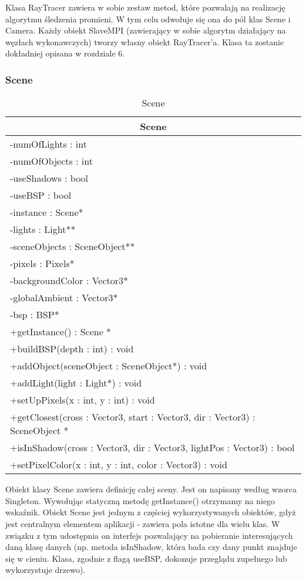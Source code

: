 Klasa RayTracer zawiera w sobie zestaw metod, które pozwalają na realizację algorytmu śledzenia promieni. W tym celu odwołuje się ona do pól klas Scene i Camera. Każdy obiekt SlaveMPI (zawierający w sobie algorytm działający na węzłach wykonawczych) tworzy własny obiekt RayTracer'a. Klasa ta zostanie dokładniej opisana w rozdziale 6.

\subsubsection{Scene}

\footnotesize
\begin{longtable}{|p{14cm}|}
    \caption{Scene} \label{tab:Scene} \\ \hline
    \multicolumn{1}{|c|}{Scene} \\ \hline
    -numOfLights : int \\
    -numOfObjects : int \\
    -useShadows : bool \\
    -useBSP : bool \\
    -instance : Scene* \\
    -lights : Light** \\
    -sceneObjects : SceneObject** \\
    -pixels : Pixels* \\
    -backgroundColor : Vector3* \\
    -globalAmbient : Vector3* \\
    -bsp : BSP* \\
    \hline
	+getInstance() : Scene * \\
	+buildBSP(depth : int) : void \\
	+addObject(sceneObject : SceneObject*) : void \\
	+addLight(light : Light*) : void \\
	+setUpPixels(x : int, y : int) : void \\
	+getClosest(cross : Vector3, start : Vector3, dir : Vector3) : SceneObject * \\
	+isInShadow(cross : Vector3, dir : Vector3, lightPos : Vector3) : bool \\
	+setPixelColor(x : int, y : int, color : Vector3) : void \\
	\hline
\end{longtable}
\normalsize

Obiekt klasy Scene zawiera definicję całej sceny. Jest on napisany według wzorca Singleton. Wywołując statyczną metodę getInstance() otrzymamy na niego wskaźnik. Obiekt Scene jest jednym z częściej wykorzystywanych obiektów, gdyż jest centralnym elementem aplikacji - zawiera pola istotne dla wielu klas. W związku z tym udostępnia on interfejs pozwalający na pobieranie interesujących daną klasę danych (np. metoda isInShadow, która bada czy dany punkt znajduje się w cieniu. Klasa, zgodnie z flagą useBSP, dokonuje przeglądu zupełnego lub wykorzystuje drzewo).


